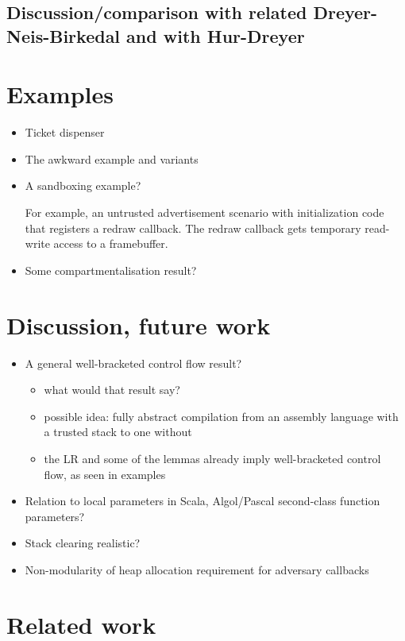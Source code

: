 \documentclass[compsoc,conference,letterpaper,fleqn]{IEEEtran}
\begin{document}
\subsection{Discussion/comparison with related Dreyer-Neis-Birkedal and with Hur-Dreyer}

\section{Examples}
\begin{itemize}
\item Ticket dispenser
\item The awkward example and variants
\item A sandboxing example?

For example, an untrusted advertisement scenario with initialization code
that registers a redraw callback. The redraw callback gets temporary
read-write access to a framebuffer.

\item Some compartmentalisation result?
\end{itemize}

\section{Discussion, future work}
\begin{itemize}
\item A general well-bracketed control flow result?
\begin{itemize}
\item what would that result say?
\item possible idea: fully abstract compilation from an assembly language with
a trusted stack to one without
\item the LR and some of the lemmas already imply well-bracketed control flow, as seen in examples
\end{itemize}
\item Relation to local parameters in Scala, Algol/Pascal second-class function parameters?
\item Stack clearing realistic?
\item Non-modularity of heap allocation requirement for adversary callbacks
\end{itemize}

\section{Related work}
\end{document}

